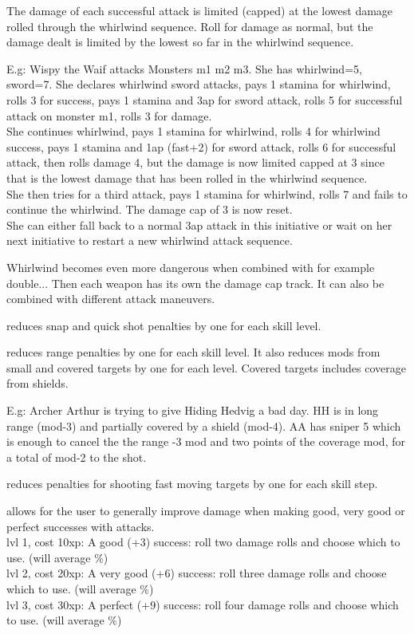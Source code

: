 The damage of each successful attack is limited (capped) at the lowest damage rolled through the whirlwind sequence. Roll for damage as normal, but the damage dealt is limited by the lowest so far in the whirlwind sequence.

E.g: Wispy the Waif attacks Monsters m1 m2 m3. She has whirlwind=5, sword=7.
She declares whirlwind sword attacks, 
pays 1 stamina for whirlwind, rolls 3 for success, pays 1 stamina and 3ap for sword attack, rolls 5 for successful attack on monster m1, rolls 3 for damage. \\
She continues whirlwind, pays 1 stamina for whirlwind, rolls 4 for whirlwind success, pays 1 stamina and 1ap (fast+2) for sword attack, rolls 6 for successful attack, then rolls damage 4, but the damage is now limited capped at 3 since that is the lowest damage that has been rolled in the whirlwind sequence. \\
She then tries for a third attack, pays 1 stamina for whirlwind, rolls 7 and fails to continue the whirlwind. The damage cap of 3 is now reset. \\
She can either fall back to a normal 3ap attack in this initiative or wait on her next initiative to restart a new whirlwind attack sequence.

Whirlwind becomes even more dangerous when combined with for example double... Then each weapon has its own the damage cap track. It can also be combined with different attack maneuvers.


 reduces snap and quick shot penalties by one for each skill level.


 reduces range penalties by one for each skill level. It also reduces mods from small and covered targets by one for each level. Covered targets includes coverage from shields.

E.g: Archer Arthur is trying to give Hiding Hedvig a bad day. HH is in long range (mod-3) and partially covered by a shield (mod-4). AA has sniper 5 which is enough to cancel the the range -3 mod and two points of the coverage mod, for a total of mod-2 to the shot.


 reduces penalties for shooting fast moving targets by one for each skill step.


 allows for the user to generally improve damage when making good, very good or perfect successes with attacks. \\
lvl 1, cost 10xp: A good (+3) success: roll two damage rolls and choose which to use. (will average \%) \\
lvl 2, cost 20xp: A very good (+6) success: roll three damage rolls and choose which to use. (will average \%) \\
lvl 3, cost 30xp: A perfect (+9) success: roll four damage rolls and choose which to use. (will average \%)


